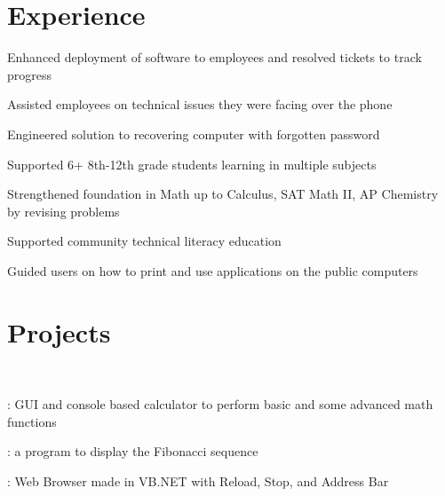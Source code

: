 \documentclass[]{deedy-resume-openfont}
\begin{document}
\begin{minipage}[t]{0.66\textwidth} 


\section{Experience}

\vspace{\topsep} %
\begin{tightemize}
\item Enhanced deployment of software to employees and resolved tickets to track progress
\item Assisted employees on technical issues they were facing over the phone
\item Engineered solution to recovering computer with forgotten password
\end{tightemize}
\sectionsep

\begin{tightemize}
\item  Supported 6+ 8th-12th grade students learning in multiple subjects
\item  Strengthened foundation in Math up to Calculus, SAT Math II, AP Chemistry by revising problems
\end{tightemize}
\sectionsep

\begin{tightemize}
\item Supported community technical literacy education
\item Guided users on how to print and use applications on the public computers
\end{tightemize}
\sectionsep


\section{Projects}
\\
\begin{tightemize}
\item {}: GUI and console based calculator to perform basic and some advanced math functions
\item {}: a program to display the Fibonacci sequence
\item {}: Web Browser made in VB.NET with Reload, Stop, and Address Bar
\end{tightemize}
\sectionsep


\end{minipage}
\end{document}
